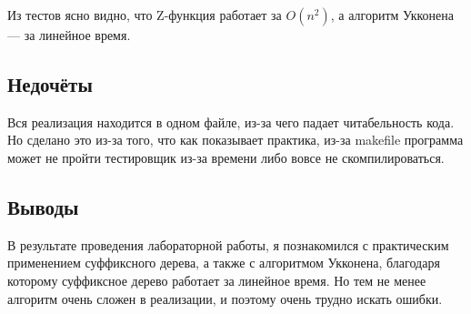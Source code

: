 \documentclass[12pt]{article}
\begin{document}
    Из тестов ясно видно, что Z-функция работает за $O(n^2)$, а алгоритм 
    Укконена — за линейное время.

    \subsection*{Недочёты}

    Вся реализация находится в одном файле, из-за чего падает читабельность кода. Но сделано это из-за того, что как показывает практика,
    из-за makefile программа может не пройти тестировщик из-за времени либо вовсе не скомпилироваться.

    \subsection*{Выводы}

    В результате проведения лабораторной работы, я познакомился с практическим применением 
    суффиксного дерева, а также с алгоритмом Укконена, благодаря которому суффиксное дерево работает за линейное время. Но 
    тем не менее алгоритм очень сложен в реализации, и поэтому очень трудно искать ошибки.
\end{document}
